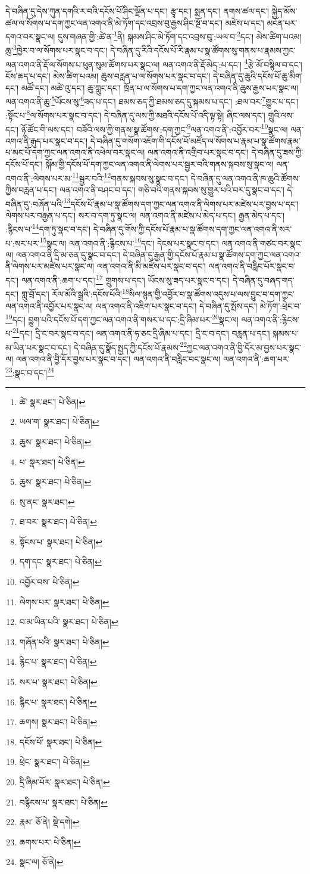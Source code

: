 དེ་བཞིན་དུ་དེས་ཀུན་དགའི་ར་བའི་དངོས་པོ་ཤིང་ལྗོན་པ་དང་། རྩྭ་དང་། སྨན་དང་། ནགས་ཚལ་དང་། སྐྱེད་མོས་ཚལ་ལ་སོགས་པ་དག་ཀྱང་ལན་འགའ་ནི་མེ་ཏོག་དང་འབྲས་བུ་རྒྱས་ཤིང་སྔོ་བ་དང་། མཛེས་པ་དང་། མངོན་པར་དགའ་བར་སྣང་ལ། དུས་གཞན་གྱི་:ཚེ་ན་\footnote{ཚེ་  སྣར་ཐང་།  པེ་ཅིན། }ནི། སྐམས་ཤིང་མེ་ཏོག་དང་འབྲས་བུ་:ཡལ་བ་\footnote{ཡལ་ག་  སྣར་ཐང་།  པེ་ཅིན། }དང་། མེས་ཚིག་པའམ། ཆུ་\footnote{ཆུས་  སྣར་ཐང་།  པེ་ཅིན། }ཁྱེར་བ་ལ་སོགས་པར་སྣང་བ་དང་། དེ་བཞིན་དུ་རིའི་དངོས་པོ་རི་རྣམ་པ་སྣ་ཚོགས་སུ་གནས་པ་རྣམས་ཀྱང་ལན་འགའ་ནི་རྡོ་ལ་སོགས་པ་ཕུན་སུམ་ཚོགས་པར་སྣང་ལ། ལན་འགའ་ནི་རྡོ་མེད་:པ་དང་། \footnote{པ་  སྣར་ཐང་།  པེ་ཅིན། }རྩེ་མོ་བསྙིལ་བ་དང་། ངོས་ཆད་པ་དང་། མེས་ཚིག་པའམ། ཆུས་བརླན་པ་ལ་སོགས་པར་སྣང་བ་དང་། དེ་བཞིན་དུ་ཆུའི་དངོས་པོ་ཆུ་མིག་དང་། མཚོ་དང་། མཚེ་འུ་དང་། ཆུ་ཀླུང་དང་། ཁྲོན་པ་ལ་སོགས་པ་དག་ཀྱང་ལན་འགའ་ནི་ཆུས་རྒྱས་པར་སྣང་ལ། ལན་འགའ་ནི་ཆུ་\footnote{ཆུས་  སྣར་ཐང་།  པེ་ཅིན། }ཡོངས་སུ་\footnote{སུ་ནང་  སྣར་ཐང་། }ཟད་པ་དང་། ཐམས་ཅད་ཀྱི་ཐམས་ཅད་དུ་སྐམས་པ་དང་། :ཐལ་བར་\footnote{ཐ་བར་  སྣར་ཐང་།  པེ་ཅིན། }གྱུར་པ་དང་། :སྟོང་པ་\footnote{སྟོངས་པ་  སྣར་ཐང་།  པེ་ཅིན། }ལ་སོགས་པར་སྣང་བ་དང་། དེ་བཞིན་དུ་ལས་ཀྱི་མཐའི་དངོས་པོ་འདི་ལྟ་སྟེ། ཞིང་ལས་དང་། གྲུའི་ལས་དང་། ཉོ་ཚོང་གི་ལས་དང་། བཟོའི་ལས་ཀྱི་གནས་སྣ་ཚོགས་:དག་ཀྱང་\footnote{དག་དང་  སྣར་ཐང་།  པེ་ཅིན། }ལན་འགའ་ནི་:འབྱོར་བར་\footnote{འབྱོར་བས་  པེ་ཅིན། }སྣང་ལ། ལན་འགའ་ནི་རྒུད་པར་སྣང་བ་དང་། དེ་བཞིན་དུ་གསོག་འཇོག་གི་དངོས་པོ་མཛོད་ལ་སོགས་པ་རྣམ་པ་སྣ་ཚོགས་རྣམ་པ་མང་པོ་དག་ཀྱང་ལན་འགའ་ནི་འཕེལ་བར་སྣང་ལ། ལན་འགའ་ནི་འགྲིབ་པར་སྣང་བ་དང་། དེ་བཞིན་དུ་ཟས་ཀྱི་དངོས་པོ་དང་། སྐོམ་གྱི་དངོས་པོ་དག་ཀྱང་ལན་འགའ་ནི་ལེགས་པར་སྦྱར་བའི་གནས་སྐབས་སུ་སྣང་ལ། ལན་འགའ་ནི་:ལེགས་པར་མ་\footnote{ལེགས་པར་  སྣར་ཐང་།  པེ་ཅིན། }སྦྱར་བའི་\footnote{བ་མ་ཡིན་པའི་  སྣར་ཐང་།  པེ་ཅིན། }གནས་སྐབས་སུ་སྣང་བ་དང་། དེ་བཞིན་དུ་ལན་འགའ་ནི་ཁ་ཆུའི་ཚོགས་ཀྱིས་བརླན་པ་དང་། ལན་འགའ་ནི་བཤང་བ་དང་། གཅི་བའི་གནས་སྐབས་སུ་གྱུར་པའི་བར་དུ་སྣང་བ་དང་། དེ་བཞིན་དུ་:བཞོན་པའི་\footnote{གཞོན་པའི་  སྣར་ཐང་།  པེ་ཅིན། }དངོས་པོ་རྣམ་པ་སྣ་ཚོགས་དག་ཀྱང་ལན་འགའ་ནི་ལེགས་པར་མཛེས་པར་བྱས་པ་དང་། ལེགས་པར་བརྒྱན་པ་དང་། སར་བ་དག་ཏུ་སྣང་ལ། ལན་འགའ་ནི་མཛེས་པ་མེད་པ་དང་། རྒྱན་མེད་པ་དང་། :རྙིངས་པ་\footnote{རྙིང་པ་  སྣར་ཐང་།  པེ་ཅིན། }དག་ཏུ་སྣང་བ་དང་། དེ་བཞིན་དུ་གོས་ཀྱི་དངོས་པོ་རྣམ་པ་སྣ་ཚོགས་དག་ཀྱང་ལན་འགའ་ནི་སར་པ་:སར་པར་\footnote{སར་པ་  སྣར་ཐང་།  པེ་ཅིན། }སྣང་ལ། ལན་འགའ་ནི་:རྙིངས་པ་\footnote{རྙིང་པ་  སྣར་ཐང་།  པེ་ཅིན། }དང་། དེངས་པར་སྣང་བ་དང་། ལན་འགའ་ནི་གཙང་བར་སྣང་ལ། ལན་འགའ་ནི་དྲི་མ་ཅན་དུ་སྣང་བ་དང་། དེ་བཞིན་དུ་རྒྱན་གྱི་དངོས་པོ་རྣམ་པ་སྣ་ཚོགས་དག་ཀྱང་ལན་འགའ་ནི་ལེགས་པར་མཛེས་པར་སྣང་ལ། ལན་འགའ་ནི་མི་མཛེས་པར་སྣང་བ་དང་། ལན་འགའ་ནི་བརླིང་པོར་སྣང་བ་དང་། ལན་འགའ་ནི་:ཆག་པ་དང་།\footnote{ཆགས།  སྣར་ཐང་།  པེ་ཅིན། } གྲུགས་པ་དང་། ཡོངས་སུ་ཟད་པར་སྣང་བ་དང་། དེ་བཞིན་དུ་བཞད་གད་དང་། གླུ་བྲོ་དང་། རོལ་མོའི་སྒྲའི་:དངོས་པོའི་\footnote{དངོས་པོ་  སྣར་ཐང་།  པེ་ཅིན། }སིལ་སྙན་གྱི་འབྱོར་བ་སྣ་ཚོགས་འདུས་པ་ལས་བྱུང་བ་དག་ཀྱང་ལན་འགའ་ནི་འབྱོར་པར་སྣང་ལ། ལན་འགའ་ནི་འཇིག་པར་སྣང་བ་དང་། དེ་བཞིན་དུ་སྤོས་དང་། མེ་ཏོག་:ཕྲེང་བ་\footnote{ཕྲེང་  སྣར་ཐང་།  པེ་ཅིན། }དང་། བྱུག་པའི་དངོས་པོ་དག་ཀྱང་ལན་འགའ་ནི་གསར་པ་དང་:དྲི་ཞིམ་པར་\footnote{དྲི་ཞིམ་པོར་  སྣར་ཐང་།  པེ་ཅིན། }སྣང་ལ། ལན་འགའ་ནི་:རྙིངས་པ་\footnote{བརྙིངས་པ་  སྣར་ཐང་།  པེ་ཅིན། }དང་། དྲི་ང་བར་སྣང་བ་དང་། ལན་འགའ་ནི་ཧ་ཅང་དྲི་ཞིམ་པ་དང་། དྲི་ང་བ་དང་། བརླན་པ་དང་། སྐམས་པ་མ་ཡིན་པར་སྣང་བ་དང་། དེ་བཞིན་དུ་སྣོད་སྤྱད་ཀྱི་དངོས་པོ་རྣམས་\footnote{རྣམ་  ཅོ་ནེ།  སྡེ་དགེ། }ཀྱང་ལན་འགའ་ནི་བྱི་དོར་མ་བྱས་པར་སྣང་ལ། ལན་འགའ་ནི་བྱི་དོར་བྱས་པར་སྣང་བ་དང་། ལན་འགའ་ནི་བརླིང་བང་སྣང་ལ། ལན་འགའ་ནི་:ཆག་པར་\footnote{ཆགས་པར་  པེ་ཅིན། }:སྣང་བ་དང་།\footnote{སྣང་ལ།  ཅོ་ནེ། } 